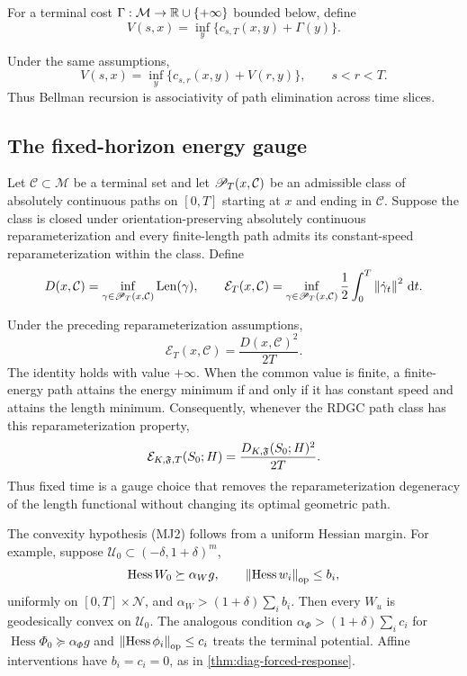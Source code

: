 For a terminal cost \(\Gamma:\mathcal M\to\mathbb R\cup\{+\infty\}\) bounded
below, define
\[
  V(s,x)
  =
  \inf_y\{c_{s,T}(x,y)+\Gamma(y)\}.
\]

\begin{corollary}
\label{cor:path-bellman}
Under the same assumptions,
\begin{equation}
  \boxed{
  V(s,x)
  =
  \inf_y\{c_{s,r}(x,y)+V(r,y)\},
  \qquad s<r<T.}
  \tag{P2}
\end{equation}
Thus Bellman recursion is associativity of path elimination across time
slices.
\end{corollary}

\subsection{The fixed-horizon energy gauge}

Let \(\mathcal C\subset\mathcal M\) be a terminal set and let
\(\mathscr P_T(x,\mathcal C)\) be an admissible class of absolutely continuous
paths on \([0,T]\) starting at \(x\) and ending in \(\mathcal C\).  Suppose
the class is closed under orientation-preserving absolutely continuous
reparameterization and every finite-length path admits its constant-speed
reparameterization within the class.  Define
\[
  D(x,\mathcal C)=\inf_{\gamma\in\mathscr P_T(x,\mathcal C)}\operatorname{Len}(\gamma),
  \qquad
  \mathcal E_T(x,\mathcal C)
  =\inf_{\gamma\in\mathscr P_T(x,\mathcal C)}
  \frac12\int_0^T\left\lVert \dot\gamma_t\right\rVert^2\,\mathrm d t.
\]

\begin{theorem}
\label{thm:length-energy-gauge}
Under the preceding reparameterization assumptions,
\begin{equation}
  \boxed{
  \mathcal E_T(x,\mathcal C)
  =\frac{D(x,\mathcal C)^2}{2T}.}
  \tag{P3}
\end{equation}
The identity holds with value \(+\infty\).  When the common value is finite,
a finite-energy path attains the energy minimum if and only if it has constant
speed and attains the length minimum.  Consequently, whenever
the RDGC path class has this reparameterization property,
\[
  \mathcal E_{K,\mathfrak F,T}(S_0;H)
  =\frac{D_{K,\mathfrak F}(S_0;H)^2}{2T}.
\]
Thus fixed time is a gauge choice that removes the reparameterization
degeneracy of the length functional without changing its optimal geometric
path.
\end{theorem}

\begin{remark}
The convexity hypothesis (MJ2) follows from a uniform Hessian margin.  For
example, suppose \(\mathcal U_0\subset(-\delta,1+\delta)^m\),
\[
  \operatorname{Hess}W_0\succeq\alpha_W g,
  \qquad
  \left\lVert \operatorname{Hess}w_i\right\rVert_{\mathrm{op}}\le b_i,
\]
uniformly on \([0,T]\times\mathcal N\), and
\(\alpha_W>(1+\delta)\sum_i b_i\).  Then every \(W_u\) is geodesically
convex on \(\mathcal U_0\).  The analogous condition
\(\alpha_\Phi>(1+\delta)\sum_i c_i\) for
\(\operatorname{Hess}\Phi_0\succeq\alpha_\Phi g\) and
\(\left\lVert \operatorname{Hess}\phi_i\right\rVert_{\mathrm{op}}\le c_i\) treats the terminal
potential.  Affine interventions have \(b_i=c_i=0\), as in
\cref{thm:diag-forced-response}.
\end{remark}

